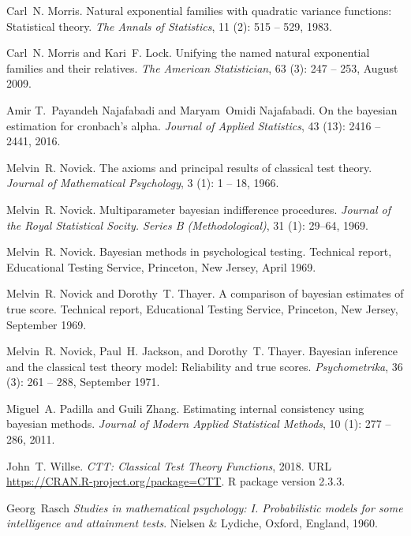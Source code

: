 \documentclass[12pt,epsfig]{article}
\begin{document}
\begin{thebibliography}{28}
Carl~N. Morris.
\newblock Natural exponential families with quadratic variance functions:
  Statistical theory.
\newblock \emph{The Annals of Statistics}, 11 (2): 515 --
  529, 1983.

Carl~N. Morris and Kari~F. Lock.
\newblock Unifying the named natural exponential families and their relatives.
\newblock \emph{The American Statistician}, 63 (3): 247 --
  253, August 2009.

Amir T.~Payandeh Najafabadi and Maryam~Omidi Najafabadi.
\newblock On the bayesian estimation for cronbach's alpha.
\newblock \emph{Journal of Applied Statistics}, 43 (13): 2416
  -- 2441, 2016.

Melvin~R. Novick.
\newblock The axioms and principal results of classical test theory.
\newblock \emph{Journal of Mathematical Psychology}, 3 (1): 1
  -- 18, 1966.

Melvin~R. Novick.
\newblock Multiparameter bayesian indifference procedures.
\newblock \emph{Journal of the Royal Statistical Socity. Series B
  (Methodological)}, 31 (1): 29--64, 1969{}.

Melvin~R. Novick.
\newblock Bayesian methods in psychological testing.
\newblock Technical report, Educational Testing Service, Princeton, New Jersey,
  April 1969{}.

Melvin~R. Novick and Dorothy~T. Thayer.
\newblock A comparison of bayesian estimates of true score.
\newblock Technical report, Educational Testing Service, Princeton, New Jersey,
  September 1969.

Melvin~R. Novick, Paul~H. Jackson, and Dorothy~T. Thayer.
\newblock Bayesian inference and the classical test theory model: Reliability
  and true scores.
\newblock \emph{Psychometrika}, 36 (3): 261 -- 288, September
  1971.

Miguel~A. Padilla and Guili Zhang.
\newblock Estimating internal consistency using bayesian methods.
\newblock \emph{Journal of Modern Applied Statistical Methods}, 10
  (1): 277 -- 286, 2011.

John~T. Willse.
\newblock \emph{CTT: Classical Test Theory Functions}, 2018.
\newblock URL \url{https://CRAN.R-project.org/package=CTT}.
\newblock R package version 2.3.3.

Georg~Rasch
\newblock \emph{Studies in mathematical psychology: I. Probabilistic models for some intelligence and attainment tests}.
\newblock Nielsen \& Lydiche, Oxford, England, 1960.


\end{thebibliography}
\end{document}
